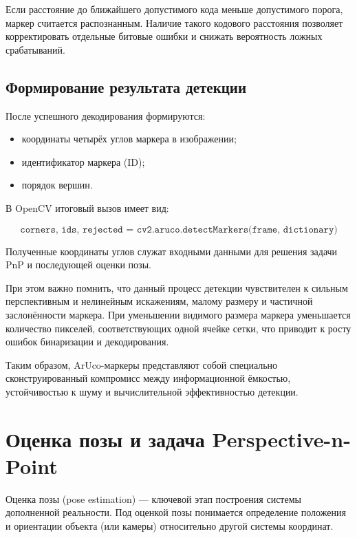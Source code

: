 \documentclass[a4paper,12pt]{article}
\begin{document}
Если расстояние до ближайшего допустимого кода меньше допустимого порога, маркер считается распознанным. Наличие такого кодового расстояния позволяет корректировать отдельные битовые ошибки и снижать вероятность ложных срабатываний.

\subsection*{Формирование результата детекции}

После успешного декодирования формируются:

\begin{itemize}
    \item координаты четырёх углов маркера в изображении;
    \item идентификатор маркера (ID);
    \item порядок вершин.
\end{itemize}

В OpenCV итоговый вызов имеет вид:

\begin{equation*}
\texttt{corners, ids, rejected = cv2.aruco.detectMarkers(frame, dictionary)}
\end{equation*}

Полученные координаты углов служат входными данными для решения задачи PnP и последующей оценки позы.

\bigskip

При этом важно помнить, что данный процесс детекции чувствителен к сильным перспективным и нелинейным искажениям, малому размеру и частичной заслонённости маркера. При уменьшении видимого размера маркера уменьшается количество пикселей, соответствующих одной ячейке сетки, что приводит к росту ошибок бинаризации и декодирования.

Таким образом, ArUco-маркеры представляют собой специально сконструированный компромисс между информационной ёмкостью, устойчивостью к шуму и вычислительной эффективностью детекции.













\section*{Оценка позы и задача Perspective-n-Point}

Оценка позы (pose estimation) --- ключевой этап построения системы дополненной реальности. Под оценкой позы понимается определение положения и ориентации объекта (или камеры) относительно другой системы координат.
\end{document}
